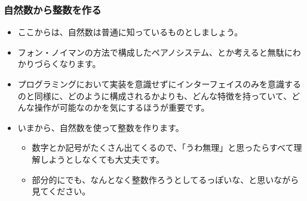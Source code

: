 \documentclass[dvipdfmx]{beamer}
\begin{document}
  \begin{frame}
    \frametitle{自然数から整数を作る}

    \begin{itemize}
      \item ここからは、自然数は普通に知っているものとしましょう。
      \item フォン・ノイマンの方法で構成したペアノシステム、とか考えると無駄にわかりづらくなります。
      \item プログラミングにおいて実装を意識せずにインターフェイスのみを意識するのと同様に、どのように構成されるかよりも、どんな特徴を持っていて、どんな操作が可能なのかを気にするほうが重要です。
      \item いまから、自然数を使って整数を作ります。
      \begin{itemize}
        \item 数字とか記号がたくさん出てくるので、「うわ無理」と思ったらすべて理解しようとしなくても大丈夫です。
        \item 部分的にでも、なんとなく整数作ろうとしてるっぽいな、と思いながら見てください。
      \end{itemize}
    \end{itemize}

  \end{frame}
\end{document}
